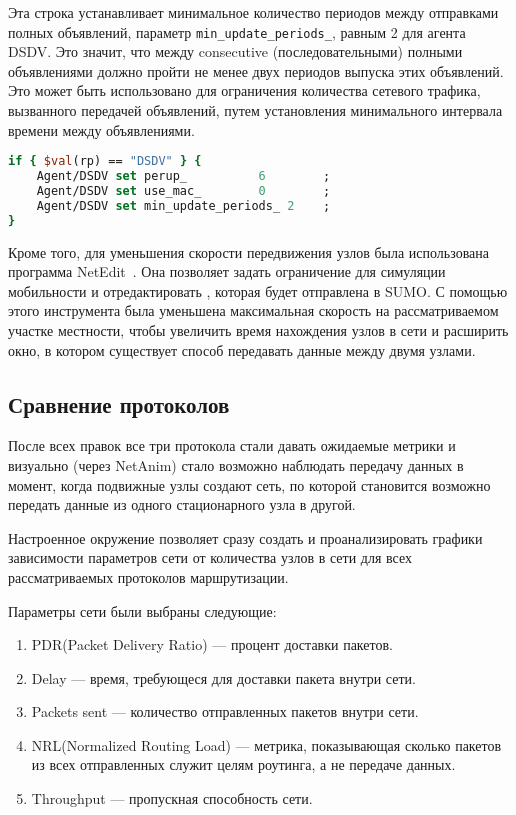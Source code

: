 Эта строка устанавливает минимальное количество периодов между отправками полных объявлений, параметр \verb|min_update_periods_|, равным 2 для агента DSDV. Это значит, что между consecutive (последовательными) полными объявлениями должно пройти не менее двух периодов выпуска этих объявлений. Это может быть использовано для ограничения количества сетевого трафика, вызванного передачей объявлений, путем установления минимального интервала времени между объявлениями.

\begin{lstlisting}[language=tcl, style=mystyle, caption=Дополнительные настройки для Agent/DSDV, label=listing:agent-dsdv]
if { $val(rp) == "DSDV" } {
    Agent/DSDV set perup_          6        ;
    Agent/DSDV set use_mac_        0        ;
    Agent/DSDV set min_update_periods_ 2    ;
}
\end{lstlisting}

Кроме того, для уменьшения скорости передвижения узлов была использована программа NetEdit~\cite{deepika2022sumo, netedit}. Она позволяет задать ограничение для симуляции мобильности и отредактировать , которая будет отправлена в SUMO. С помощью этого инструмента была уменьшена максимальная скорость на рассматриваемом участке местности, чтобы увеличить время нахождения узлов в сети и расширить окно, в котором существует способ передавать данные между двумя узлами.

\subsection{Сравнение протоколов}

После всех правок все три протокола стали давать ожидаемые метрики и визуально (через NetAnim) стало возможно наблюдать передачу данных в момент, когда подвижные узлы создают сеть, по которой становится возможно передать данные из одного стационарного узла в другой.

Настроенное окружение позволяет сразу создать и проанализировать графики зависимости параметров сети от количества узлов в сети для всех рассматриваемых протоколов маршрутизации.

Параметры сети были выбраны следующие: 

\begin{enumerate}
    \item PDR(Packet Delivery Ratio) --- процент доставки пакетов.
    \item Delay --- время, требующеся для доставки пакета внутри сети.
    \item Packets sent --- количество отправленных пакетов внутри сети.
    \item NRL(Normalized Routing Load) --- метрика, показывающая сколько пакетов из всех отправленных служит целям роутинга, а не передаче данных.
    \item Throughput --- пропускная способность сети.
\end{enumerate}

